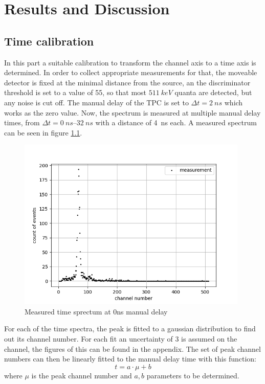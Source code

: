 \chapter{Results and Discussion}

\section{Time calibration}

In this part a suitable calibration to transform the channel axis to a time axis is determined. In order to collect appropriate measurements for that, the moveable detector is fixed at the minimal distance from the source, an the discriminator threshold is set to a value of 55, so that most $\SI{511}{keV}$ quanta are detected, but any noise is cut off. The manual delay of the TPC is set to $\Delta t = \SI{2}{ns}$ which works as the zero value. Now, the spectrum is measured at multiple manual delay times, from $\Delta t = \SIrange[]{0}{32}{ns}$ with a distance of \SI{4}{ns} each. A measured spectrum can be seen in figure \ref{fig:0nsnofit}.

\begin{figure}[H]
    \centering
    \includegraphics[width=110mm,scale=0.5]{Positronium/include/0nsnofit.png}
    \caption{Measured time sprectum at 0ns manual delay} 
    \label{fig:0nsnofit}
\end{figure}

For each of the time spectra, the peak is fitted to a gaussian distribution to find out its channel number. For each fit an uncertainty of 3 is assumed on the channel, the figures of this can be found in the appendix. The set of peak channel numbers can then be linearly fitted to the manual delay time with this function: 
$$ t = a\cdot\mu +b$$
where $\mu$ is the peak channel number and $a,b$ parameters to be determined.
